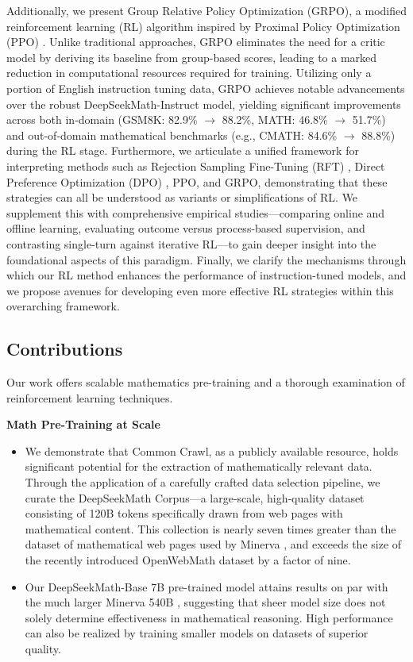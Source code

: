Additionally, we present Group Relative Policy Optimization (GRPO), a modified reinforcement learning (RL) algorithm inspired by Proximal Policy Optimization (PPO) \citep{schulman2017proximal}. Unlike traditional approaches, GRPO eliminates the need for a critic model by deriving its baseline from group-based scores, leading to a marked reduction in computational resources required for training. Utilizing only a portion of English instruction tuning data, GRPO achieves notable advancements over the robust DeepSeekMath-Instruct model, yielding significant improvements across both in-domain (GSM8K: 82.9\% $\rightarrow$ 88.2\%, MATH: 46.8\% $\rightarrow$ 51.7\%) and out-of-domain mathematical benchmarks (e.g., CMATH: 84.6\% $\rightarrow$ 88.8\%) during the RL stage. Furthermore, we articulate a unified framework for interpreting methods such as Rejection Sampling Fine-Tuning (RFT) \citep{yuan2023scaling}, Direct Preference Optimization (DPO) \citep{dpo}, PPO, and GRPO, demonstrating that these strategies can all be understood as variants or simplifications of RL. We supplement this with comprehensive empirical studies—comparing online and offline learning, evaluating outcome versus process-based supervision, and contrasting single-turn against iterative RL—to gain deeper insight into the foundational aspects of this paradigm. Finally, we clarify the mechanisms through which our RL method enhances the performance of instruction-tuned models, and we propose avenues for developing even more effective RL strategies within this overarching framework.

\subsection{Contributions}
Our work offers scalable mathematics pre-training and a thorough examination of reinforcement learning techniques.

\textbf{Math Pre-Training at Scale}

\begin{itemize}[topsep=0pt]
    \item We demonstrate that Common Crawl, as a publicly available resource, holds significant potential for the extraction of mathematically relevant data. Through the application of a carefully crafted data selection pipeline, we curate the DeepSeekMath Corpus—a large-scale, high-quality dataset consisting of 120B tokens specifically drawn from web pages with mathematical content. This collection is nearly seven times greater than the dataset of mathematical web pages used by Minerva \citep{minerva}, and exceeds the size of the recently introduced OpenWebMath dataset \citep{openwebmath} by a factor of nine.

    \item Our DeepSeekMath-Base 7B pre-trained model attains results on par with the much larger Minerva 540B \citep{minerva}, suggesting that sheer model size does not solely determine effectiveness in mathematical reasoning. High performance can also be realized by training smaller models on datasets of superior quality.
\end{itemize}

